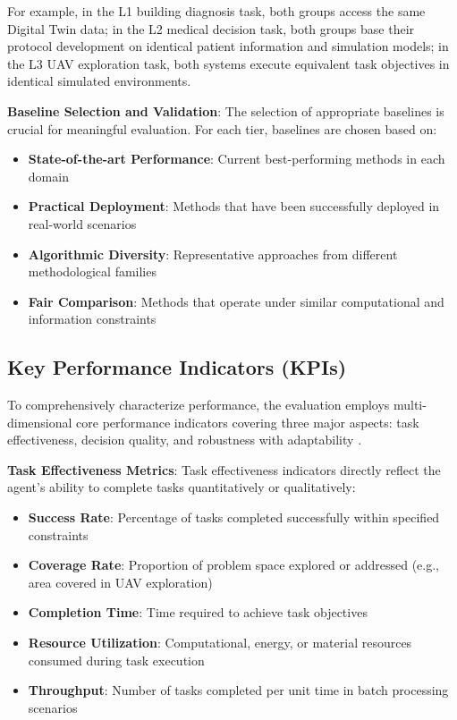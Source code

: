For example, in the L1 building diagnosis task, both groups access the same Digital Twin data; in the L2 medical decision task, both groups base their protocol development on identical patient information and simulation models; in the L3 UAV exploration task, both systems execute equivalent task objectives in identical simulated environments.

\textbf{Baseline Selection and Validation}: The selection of appropriate baselines is crucial for meaningful evaluation. For each tier, baselines are chosen based on:

\begin{itemize}
\item \textbf{State-of-the-art Performance}: Current best-performing methods in each domain
\item \textbf{Practical Deployment}: Methods that have been successfully deployed in real-world scenarios
\item \textbf{Algorithmic Diversity}: Representative approaches from different methodological families
\item \textbf{Fair Comparison}: Methods that operate under similar computational and information constraints
\end{itemize}

\subsection{Key Performance Indicators (KPIs)}

To comprehensively characterize performance, the evaluation employs multi-dimensional core performance indicators covering three major aspects: task effectiveness, decision quality, and robustness with adaptability \cite{hernandez2022measuring}.

\textbf{Task Effectiveness Metrics}: Task effectiveness indicators directly reflect the agent's ability to complete tasks quantitatively or qualitatively:

\begin{itemize}
\item \textbf{Success Rate}: Percentage of tasks completed successfully within specified constraints
\item \textbf{Coverage Rate}: Proportion of problem space explored or addressed (e.g., area covered in UAV exploration)
\item \textbf{Completion Time}: Time required to achieve task objectives
\item \textbf{Resource Utilization}: Computational, energy, or material resources consumed during task execution
\item \textbf{Throughput}: Number of tasks completed per unit time in batch processing scenarios
\end{itemize}

